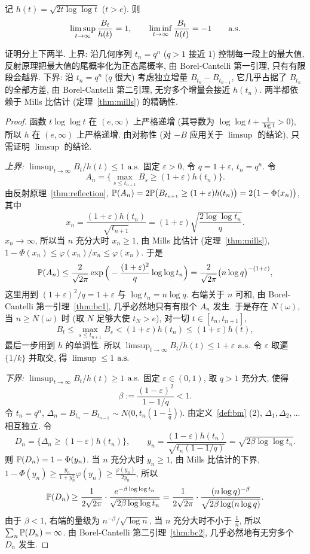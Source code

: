 \begin{theorem}[重对数律]\label{thm:lil}
记 $h(t)=\sqrt{2t\log\log t}$ ($t>e$). 则
\[
\limsup_{t\to\infty}\frac{B_t}{h(t)}=1,\qquad\liminf_{t\to\infty}\frac{B_t}{h(t)}=-1\qquad\as
\]
\end{theorem}

证明分上下两半. 上界: 沿几何序列 $t_n=q^n$ ($q>1$ 接近 $1$) 控制每一段上的最大值, 反射原理把最大值的尾概率化为正态尾概率, 由 Borel-Cantelli 第一引理, 只有有限段会越界. 下界: 沿 $t_n=q^n$ ($q$ 很大) 考虑独立增量 $B_{t_n}-B_{t_{n-1}}$, 它几乎占据了 $B_{t_n}$ 的全部方差, 由 Borel-Cantelli 第二引理, 无穷多个增量会接近 $h(t_n)$. 两半都依赖于 Mills 比估计 (定理~\ref{thm:mills}) 的精确性.

\begin{proof}
函数 $t\log\log t$ 在 $(e,\infty)$ 上严格递增 (其导数为 $\log\log t+\frac{1}{\log t}>0$), 所以 $h$ 在 $(e,\infty)$ 上严格递增. 由对称性 (对 $-B$ 应用关于 $\limsup$ 的结论), 只需证明 $\limsup$ 的结论.

\emph{上界: $\limsup_{t\to\infty}B_t/h(t)\le1$ $\as$} 固定 $\varepsilon>0$, 令 $q=1+\varepsilon$, $t_n=q^n$. 令
\[
A_n=\Big\{\max_{s\le t_{n+1}}B_s\ge(1+\varepsilon)h(t_n)\Big\}.
\]
由反射原理~\ref{thm:reflection}, $\P(A_n)=2\P\big(B_{t_{n+1}}\ge(1+\varepsilon)h(t_n)\big)=2\big(1-\Phi(x_n)\big)$, 其中
\[
x_n=\frac{(1+\varepsilon)h(t_n)}{\sqrt{t_{n+1}}}=(1+\varepsilon)\sqrt{\frac{2\log\log t_n}{q}}.
\]
$x_n\to\infty$, 所以当 $n$ 充分大时 $x_n\ge1$, 由 Mills 比估计 (定理~\ref{thm:mills}), $1-\Phi(x_n)\le\varphi(x_n)/x_n\le\varphi(x_n)$. 于是
\[
\P(A_n)\le\frac{2}{\sqrt{2\pi}}\exp\Big(-\frac{(1+\varepsilon)^2}{q}\log\log t_n\Big)=\frac{2}{\sqrt{2\pi}}\big(n\log q\big)^{-(1+\varepsilon)},
\]
这里用到 $(1+\varepsilon)^2/q=1+\varepsilon$ 与 $\log t_n=n\log q$. 右端关于 $n$ 可和, 由 Borel-Cantelli 第一引理~\ref{thm:bc1}, 几乎必然地只有有限个 $A_n$ 发生. 于是存在 $N(\omega)$, 当 $n\ge N(\omega)$ 时 (取 $N$ 足够大使 $t_N>e$), 对一切 $t\in[t_n,t_{n+1}]$,
\[
B_t\le\max_{s\le t_{n+1}}B_s<(1+\varepsilon)h(t_n)\le(1+\varepsilon)h(t),
\]
最后一步用到 $h$ 的单调性. 所以 $\limsup_{t\to\infty}B_t/h(t)\le1+\varepsilon$ $\as$ 令 $\varepsilon$ 取遍 $\{1/k\}$ 并取交, 得 $\limsup\le1$ $\as$

\emph{下界: $\limsup_{t\to\infty}B_t/h(t)\ge1$ $\as$} 固定 $\varepsilon\in(0,1)$, 取 $q>1$ 充分大, 使得
\[
\beta:=\frac{(1-\varepsilon)^2}{1-1/q}<1.
\]
令 $t_n=q^n$, $\Delta_n=B_{t_n}-B_{t_{n-1}}\sim N\big(0,t_n(1-\frac{1}{q})\big)$. 由定义~\ref{def:bm} (2), $\Delta_1,\Delta_2,\dots$ 相互独立. 令
\[
D_n=\big\{\Delta_n\ge(1-\varepsilon)h(t_n)\big\},\qquad y_n=\frac{(1-\varepsilon)h(t_n)}{\sqrt{t_n(1-1/q)}}=\sqrt{2\beta\log\log t_n}.
\]
则 $\P(D_n)=1-\Phi(y_n)$. 当 $n$ 充分大时 $y_n\ge1$, 由 Mills 比估计的下界, $1-\Phi(y_n)\ge\frac{y_n}{1+y_n^2}\varphi(y_n)\ge\frac{\varphi(y_n)}{2y_n}$, 所以
\[
\P(D_n)\ge\frac{1}{2\sqrt{2\pi}}\cdot\frac{e^{-\beta\log\log t_n}}{\sqrt{2\beta\log\log t_n}}=\frac{1}{2\sqrt{2\pi}}\cdot\frac{(n\log q)^{-\beta}}{\sqrt{2\beta\log(n\log q)}}.
\]
由于 $\beta<1$, 右端的量级为 $n^{-\beta}/\sqrt{\log n}$, 当 $n$ 充分大时不小于 $\frac{1}{n}$, 所以 $\sum_n\P(D_n)=\infty$. 由 Borel-Cantelli 第二引理~\ref{thm:bc2}, 几乎必然地有无穷多个 $D_n$ 发生.


\end{proof}
